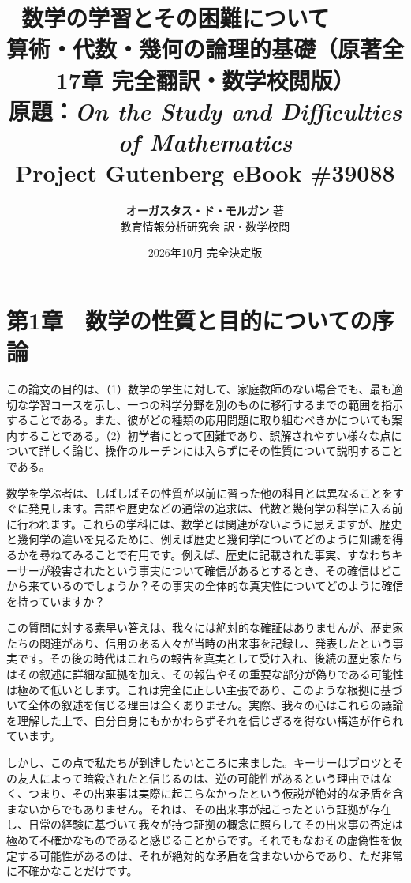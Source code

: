 \documentclass[a4paper,11pt,openany]{ltjsbook}
\title{
    {\huge\bfseries\gtfamily 数学の学習とその困難について —— 算術・代数・幾何の論理的基礎（原著全17章 完全翻訳・数学校閲版）}\\[14pt]
    {\large 原題：\textit{On the Study and Difficulties of Mathematics}}\\[6pt]
    {\normalsize Project Gutenberg eBook \#39088}
}
\author{\textbf{オーガスタス・ド・モルガン} 著\\[4pt]教育情報分析研究会 訳・数学校閲}
\date{2026年10月 完全決定版}
\begin{document}
\maketitle
\frontmatter
\tableofcontents
\clearpage
\mainmatter

\chapter{第1章　数学の性質と目的についての序論}

この論文の目的は、（1）数学の学生に対して、家庭教師のない場合でも、最も適切な学習コースを示し、一つの科学分野を別のものに移行するまでの範囲を指示することである。また、彼がどの種類の応用問題に取り組むべきかについても案内することである。（2）初学者にとって困難であり、誤解されやすい様々な点について詳しく論じ、操作のルーチンには入らずにその性質について説明することである。

数学を学ぶ者は、しばしばその性質が以前に習った他の科目とは異なることをすぐに発見します。言語や歴史などの通常の追求は、代数と幾何学の科学に入る前に行われます。これらの学科には、数学とは関連がないように思えますが、歴史と幾何学の違いを見るために、例えば歴史と幾何学についてどのように知識を得るかを尋ねてみることで有用です。例えば、歴史に記載された事実、すなわちキーサーが殺害されたという事実について確信があるとするとき、その確信はどこから来ているのでしょうか？その事実の全体的な真実性についてどのように確信を持っていますか？

この質問に対する素早い答えは、我々には絶対的な確証はありませんが、歴史家たちの関連があり、信用のある人々が当時の出来事を記録し、発表したという事実です。その後の時代はこれらの報告を真実として受け入れ、後続の歴史家たちはその叙述に詳細な証拠を加え、その報告やその重要な部分が偽りである可能性は極めて低いとします。これは完全に正しい主張であり、このような根拠に基づいて全体の叙述を信じる理由は全くありません。実際、我々の心はこれらの議論を理解した上で、自分自身にもかかわらずそれを信じざるを得ない構造が作られています。

しかし、この点で私たちが到達したいところに来ました。キーサーはブロツとその友人によって暗殺されたと信じるのは、逆の可能性があるという理由ではなく、つまり、その出来事は実際に起こらなかったという仮説が絶対的な矛盾を含まないからでもありません。それは、その出来事が起こったという証拠が存在し、日常の経験に基づいて我々が持つ証拠の概念に照らしてその出来事の否定は極めて不確かなものであると感じることからです。それでもなおその虚偽性を仮定する可能性があるのは、それが絶対的な矛盾を含まないからであり、ただ非常に不確かなことだけです。
\end{document}
